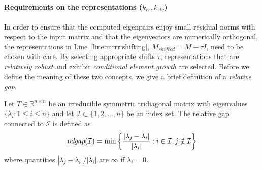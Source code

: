 \documentclass[final]{siamltex}
\newcommand{\R}{\mathbb{R}}
\newcommand{\Rnn}{\R^{n \times n}}
\begin{document}
\paragraph{Requirements on the representations ($k_{rr}, k_{elg}$)}
In order to ensure that the computed eigenpairs enjoy small residual norms
with respect to the input matrix and that the eigenvectors are
numerically orthogonal, the representations in
Line~\ref{line:mrrr:shifting}, $M_{shifted} = M - \tau I$, need to be chosen
with care. By selecting appropriate shifts $\tau$, representations that are
{\it relatively robust} and exhibit {\it conditional element growth} are
selected. Before we define the meaning of these two concepts, we give a
brief definition of a {\it relative gap}. 

\begin{definition} Let $T \in \Rnn$ be an irreducible
  symmetric tridiagonal matrix with eigenvalues $\{\lambda_i: 1 \leq i
  \leq n\}$ and let
  $\mathcal{I} \subset \{ 1, 2, \ldots , n\}$ be an index set.  
  The relative gap connected to $\mathcal{I}$ is defined as
  \begin{equation*}
    \mbox{\em relgap} (\mathcal{I}) = \min \left\{ \frac{|\lambda_j -
    \lambda_i|}{|\lambda_i|} : i \in 
    \mathcal{I}, j \notin \mathcal{I} \right\}
  \end{equation*}
  where quantities $|\lambda_j -
  \lambda_i|/|\lambda_i|$ are $\infty$ if $\lambda_i = 0$.
\label{def:relgapindexset}
\end{definition}
\end{document}
